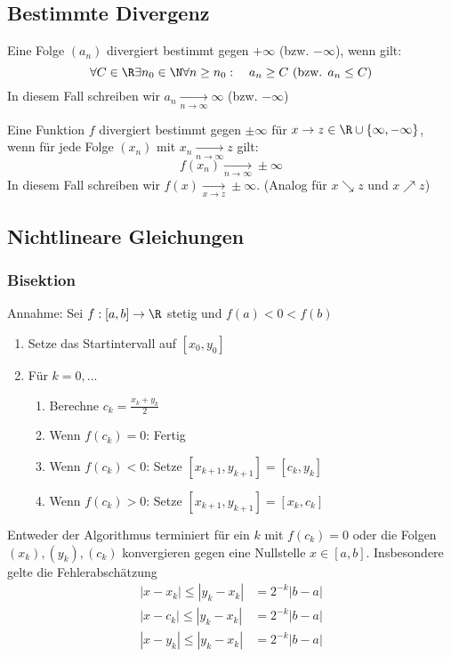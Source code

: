 	\subsection{Bestimmte Divergenz}
		\begin{Definition} 
			Eine Folge $(a_n)$ divergiert bestimmt gegen $+\infty$ (bzw. $-\infty$), wenn gilt:
			$$
				\forall C\in\R\exists n_0\in\N\forall n\geq n_0:\quad a_n\geq C \text{ (bzw. } a_n\leq C \text{)}
			$$
			In diesem Fall schreiben wir $a_n\xrightarrow[n\to\infty]{}\infty$ (bzw. $-\infty$)
		\end{Definition}
		\begin{Definition} 
			Eine Funktion $f$ divergiert bestimmt gegen $\pm\infty$ für $x\to z\in\R\cup\{\infty,-\infty\}$, wenn für jede Folge $(x_n)$ mit $x_n\xrightarrow[n\to \infty]{}z$ gilt:
			$$
				f(x_n)\xrightarrow[n\to\infty]{} \pm\infty
			$$
			In diesem Fall schreiben wir $f(x)\xrightarrow[x\to z]{}\pm\infty$. (Analog für $x\searrow z$ und $x\nearrow z$)
		\end{Definition}
	\subsection{Nichtlineare Gleichungen}
		\subsubsection{Bisektion}
			Annahme: \newline
			Sei $f:[a, b]\to\R$ stetig und $f(a)<0<f(b)$
			\begin{enumerate}
				\item Setze das Startintervall auf $[x_0, y_0]$
				\item Für $k=0, ...$
					\begin{enumerate}
						\item Berechne $c_k=\frac{x_k+y_k}{2}$
						\item Wenn $f(c_k)=0$: Fertig
						\item Wenn $f(c_k)<0$: Setze $[x_{k+1},y_{k+1}]=[c_k,y_k]$
						\item Wenn $f(c_k)>0$: Setze $[x_{k+1}, y_{k+1}]=[x_k,c_k]$
					\end{enumerate}
			\end{enumerate}
			\begin{Satz} [ ]
				Entweder der Algorithmus terminiert für ein $k$ mit $f(c_k)=0$ oder die Folgen $(x_k), (y_k), (c_k)$ konvergieren gegen eine Nullstelle $x\in[a, b]$. Insbesondere gelte die Fehlerabschätzung
				\begin{align*}
					|x-x_k|\leq|y_k-x_k|&=2^{-k}|b-a|\\
					|x-c_k|\leq|y_k-x_k|&=2^{-k}|b-a|\\
					|x-y_k|\leq|y_k-x_k|&=2^{-k}|b-a|\\
				\end{align*}
			\end{Satz}
